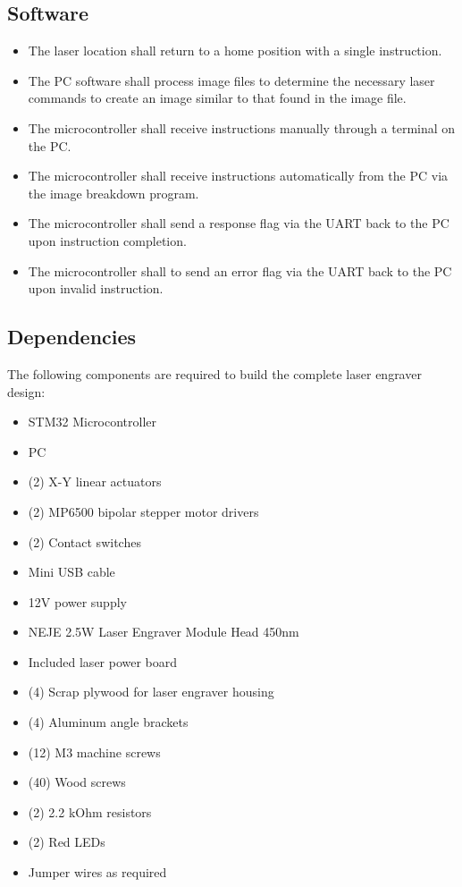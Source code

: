 \documentclass[11pt]{LaTeX-Classes/math-hw}
\begin{document}
\subsection{Software}
	\begin{itemize}
		\item The laser location shall return to a home position with a single instruction.
		\item The PC software shall process image files to determine the necessary laser commands to create an image similar to that found in the image file.
		\item The microcontroller shall receive instructions manually through a terminal on the PC.
		\item The microcontroller shall receive instructions automatically from the PC via the image breakdown program.
		\item The microcontroller shall send a response flag via the UART back to the PC upon instruction completion.
		\item The microcontroller shall to send an error flag via the UART back to the PC upon invalid instruction.
	\end{itemize}

\subsection{Dependencies}
The following components are required to build the complete laser engraver design:
\begin{itemize}
	\item STM32 Microcontroller
	\item PC
	\item (2) X-Y linear actuators
	\item (2) MP6500 bipolar stepper motor drivers
	\item (2) Contact switches
	\item Mini USB cable
	\item 12V power supply
	\item NEJE 2.5W Laser Engraver Module Head 450nm 
	\item Included laser power board
	\item (4) Scrap plywood for laser engraver housing
	\item (4) Aluminum angle brackets
	\item (12) M3 machine screws
	\item (40) Wood screws
	\item (2) 2.2 kOhm resistors
	\item (2) Red LEDs
	\item Jumper wires as required
	\end{itemize}
\end{document}
